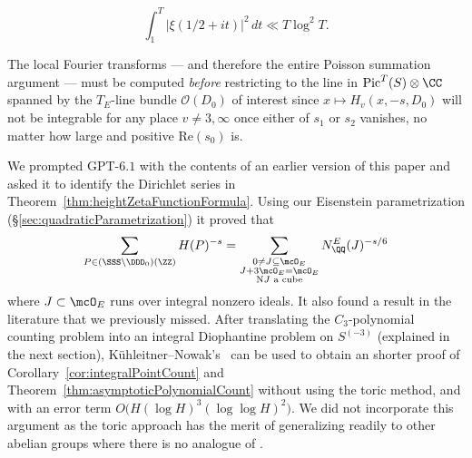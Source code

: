 \begin{equation}\label{eqn:criticalMeanSquare} \int_1^T|\xi(1/2+it)|^2\,dt \ll T\log^2T. \end{equation}

\begin{rem}\label{rem:localNonintegrability} The local Fourier transforms --- and therefore the entire Poisson summation argument --- must be computed \emph{before} restricting to the line in $\mathrm{Pic}^T(S) \otimes \CC$ spanned by the $T_E$-line bundle $\mathcal O(D_0)$ of interest since $x \mapsto H_v(x,-s,D_0)$ will not be integrable for any place $v \neq 3,\infty$ once either of $s_1$ or $s_2$ vanishes, no matter how large and positive $\mathrm{Re}(s_0)$ is. \end{rem}

\begin{rem}\label{rem:idealParametrization} We prompted GPT-$6.1$ with the contents of an earlier version of this paper and asked it to identify the Dirichlet series in Theorem~\ref{thm:heightZetaFunctionFormula}. Using our Eisenstein parametrization (\S\ref{sec:quadraticParametrization}) it proved that \[ \sum_{P \in (\SSS\setminus\DDD_0)(\ZZ)} H(P)^{-s} = \sum_{\substack{0\ne J\subseteq\mcO_E\\ J+3\mcO_E=\mcO_E\\ \mathrm N J\text{ a cube}}} N^E_\QQ(J)^{-s/6} \] where $J \subset \mcO_E$ runs over integral nonzero ideals. It also found a result in the literature \cite{kuehleitnerNowak2004} that we previously missed. After translating the $C_3$-polynomial counting problem into an integral Diophantine problem on $S^{(-3)}$ (explained in the next section), K\"uhleitner--Nowak's~\cite[Corollary~2]{kuehleitnerNowak2004} can be used to obtain an shorter proof of Corollary~\ref{cor:integralPointCount} and Theorem~\ref{thm:asymptoticPolynomialCount} without using the toric method, and with an error term $O\bigl(H(\log H)^3(\log\log H)^2\bigr)$. We did not incorporate this argument as the toric approach has the merit of generalizing readily to other abelian groups where there is no analogue of \cite{kuehleitnerNowak2004}. \end{rem}
